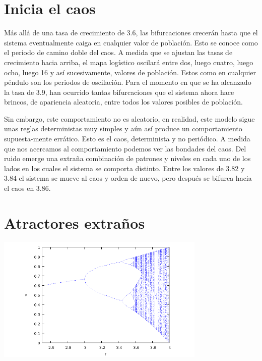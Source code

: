 \documentclass{article} %
\begin{document}
\section*{Inicia el caos}

Más allá de una tasa de crecimiento de 3.6, las bifurcaciones crecerán hasta que el sistema eventualmente caiga en cualquier valor de población. Esto se conoce como el periodo de camino doble del caos. A medida que se ajustan las tasas de crecimiento hacia arriba, el mapa logístico oscilará entre dos, luego cuatro, luego ocho, luego 16 y así sucesivamente, valores de población. Estos como en cualquier péndulo son los periodos de oscilación. Para el momento en que se ha alcanzado la tasa de 3.9, han ocurrido tantas bifurcaciones que el sistema ahora hace brincos, de apariencia aleatoria, entre todos los valores posibles de población. 

\vspace{0.5 cm}

Sin embargo, este comportamiento no es aleatorio, en realidad, este modelo sigue unas reglas deterministas muy simples y aún así produce un comportamiento supuesta-mente errático. Esto es el caos, determinista y no periódico. A medida que nos acercamos al comportamiento podemos ver las bondades del caos. Del ruido emerge una extraña combinación de patrones y niveles en cada uno de los lados en los cuales el sistema se comporta distinto. Entre los valores de 3.82 y 3.84 el sistema se mueve al caos y orden de nuevo, pero después se bifurca hacia el caos en 3.86.


\section*{Atractores extraños}

\begin{center}

	\includegraphics[width=10cm]{6.png}
    
\end{center}
\end{document}

